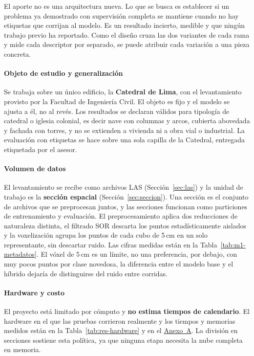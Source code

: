 El aporte no es una arquitectura nueva. Lo que se busca es establecer si un problema ya
demostrado con supervisión completa se mantiene cuando no hay etiquetas que
corrijan al modelo. Es un resultado incierto, medible y que ningún trabajo previo
ha reportado. Como el diseño cruza las dos variantes de cada rama y mide cada
descriptor por separado, se puede atribuir cada variación a una pieza concreta.


\paragraph*{Objeto de estudio y generalización}
Se trabaja sobre un único edificio, la \textbf{Catedral de Lima}, con el
levantamiento provisto por la Facultad de Ingeniería Civil. El objeto es fijo y
el modelo se ajusta a él, no al revés. Los resultados se declaran válidos para tipología de catedral o iglesia colonial,
es decir nave con columnas y arcos, cubierta abovedada y fachada con torres, y no
se extienden a vivienda ni a obra vial o industrial. La evaluación con etiquetas se
hace sobre una sola capilla de la Catedral, entregada etiquetada por el asesor.

\paragraph*{Volumen de datos}
El levantamiento se recibe como archivos LAS (Sección~\ref{sec:las}) y la unidad
de trabajo es la \textbf{sección espacial} (Sección~\ref{sec:seccion}). Una sección es el conjunto de
archivos que se preprocesan juntos, y las secciones funcionan como particiones de
entrenamiento y evaluación. El preprocesamiento
aplica dos reducciones de naturaleza distinta, el filtrado SOR descarta los
puntos estadísticamente aislados y la voxelización agrupa los puntos de cada cubo
de 5\,cm en un solo representante, sin descartar ruido. Las cifras medidas están
en la Tabla~\ref{tab:m1-metadatos}. El vóxel de 5\,cm es un límite, no una
preferencia, por debajo, con muy pocos puntos por clase novedosa, la diferencia
entre el modelo base y el híbrido dejaría de distinguirse del ruido entre
corridas.

\paragraph*{Hardware y costo}
El proyecto está limitado por cómputo y \textbf{no estima tiempos de calendario}.
El hardware en el que las pruebas corrieron realmente y los tiempos y memorias
medidos están en la Tabla~\ref{tab:res-hardware} y en el
\hyperref[sec:anexo-software]{Anexo~A}. La división en secciones sostiene esta
política, ya que ninguna etapa necesita la nube completa en memoria.

